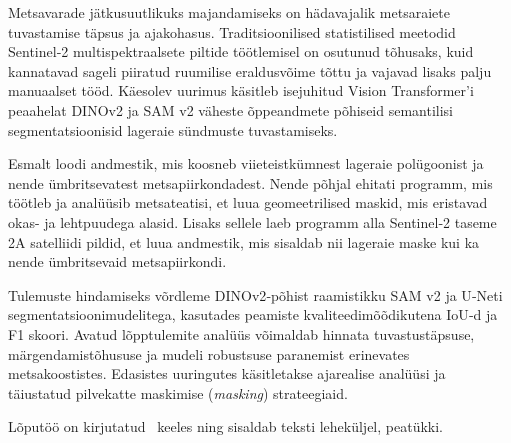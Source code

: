 Metsavarade jätkusuutlikuks majandamiseks on hädavajalik metsaraiete tuvastamise täpsus ja ajakohasus. Traditsioonilised statistilised meetodid Sentinel‑2 multispektraalsete piltide töötlemisel on osutunud tõhusaks, kuid kannatavad sageli piiratud ruumilise eraldusvõime tõttu ja vajavad lisaks palju manuaalset tööd. Käesolev uurimus käsitleb isejuhitud Vision Transformer’i peaahelat DINOv2 ja  SAM v2 väheste õppeandmete põhiseid semantilisi segmentatsioonisid lageraie sündmuste tuvastamiseks.

Esmalt loodi andmestik, mis koosneb viieteistkümnest lageraie polügoonist ja nende ümbritsevatest metsapiirkondadest. Nende põhjal ehitati programm, mis töötleb ja analüüsib metsateatisi, et luua geomeetrilised maskid, mis eristavad okas- ja lehtpuudega alasid. Lisaks sellele laeb programm alla Sentinel‑2 taseme 2A satelliidi pildid, et luua andmestik, mis sisaldab nii lageraie maske kui ka nende ümbritsevaid metsapiirkondi.

Tulemuste hindamiseks võrdleme DINOv2‑põhist raamistikku SAM v2 ja U‑Neti segmentatsioonimudelitega, kasutades peamiste kvaliteedimõõdikutena IoU‑d ja F1 skoori. Avatud lõpptulemite analüüs võimaldab hinnata tuvastustäpsuse, märgendamistõhususe ja mudeli robustsuse paranemist erinevates metsakoostistes. Edasistes uuringutes käsitletakse ajarealise analüüsi ja täiustatud pilvekatte maskimise (\textit{masking}) strateegiaid.

Lõputöö on kirjutatud \langEst~keeles ning sisaldab teksti \calculatepages leheküljel, 
 peatükki.
